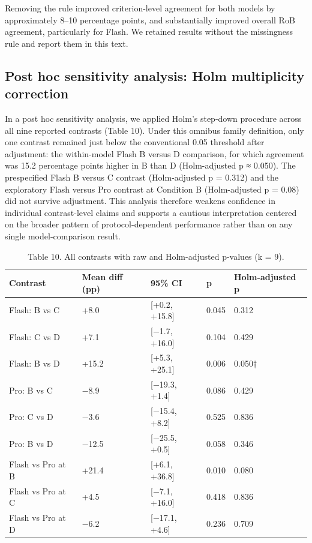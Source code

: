\documentclass[11pt,a4paper]{article}
\begin{document}
Removing the rule improved criterion-level agreement for both models by approximately 8–10 percentage points, and substantially improved overall RoB agreement, particularly for Flash. We retained results without the missingness rule and report them in this text.

\subsection{Post hoc sensitivity analysis: Holm multiplicity correction}

In a post hoc sensitivity analysis, we applied Holm's step-down procedure across all nine reported contrasts (Table 10). Under this omnibus family definition, only one contrast remained just below the conventional 0.05 threshold after adjustment: the within-model Flash B versus D comparison, for which agreement was 15.2 percentage points higher in B than D (Holm-adjusted p ≈ 0.050). The prespecified Flash B versus C contrast (Holm-adjusted p = 0.312) and the exploratory Flash versus Pro contrast at Condition B (Holm-adjusted p = 0.08) did not survive adjustment. This analysis therefore weakens confidence in individual contrast-level claims and supports a cautious interpretation centered on the broader pattern of protocol-dependent performance rather than on any single model-comparison result.

\begin{table}[H]
\centering
\caption{Table 10. All contrasts with raw and Holm-adjusted p-values (k = 9).}
\label{tab:table10}
\begin{tabular}{lllll}
\toprule
Contrast & Mean diff (pp) & 95\% CI & p & Holm-adjusted p \\
\midrule
Flash: B vs C & +8.0 & [+0.2, +15.8] & 0.045 & 0.312 \\
Flash: C vs D & +7.1 & [−1.7, +16.0] & 0.104 & 0.429 \\
Flash: B vs D & +15.2 & [+5.3, +25.1] & 0.006 & 0.050† \\
Pro: B vs C & −8.9 & [−19.3, +1.4] & 0.086 & 0.429 \\
Pro: C vs D & −3.6 & [−15.4, +8.2] & 0.525 & 0.836 \\
Pro: B vs D & −12.5 & [−25.5, +0.5] & 0.058 & 0.346 \\
Flash vs Pro at B & +21.4 & [+6.1, +36.8] & 0.010 & 0.080 \\
Flash vs Pro at C & +4.5 & [−7.1, +16.0] & 0.418 & 0.836 \\
Flash vs Pro at D & −6.2 & [−17.1, +4.6] & 0.236 & 0.709 \\
\bottomrule
\end{tabular}
\end{table}
\end{document}
